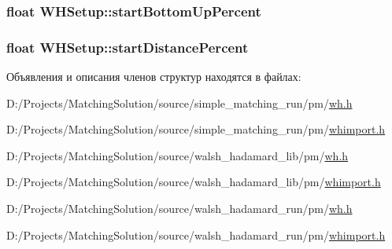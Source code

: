 \hypertarget{struct_w_h_setup_862a743cf81ffe212002e65275690fd5}{
\subsubsection[{startBottomUpPercent}]{\setlength{\rightskip}{0pt plus 5cm}float {\bf WHSetup::startBottomUpPercent}}}
\label{struct_w_h_setup_862a743cf81ffe212002e65275690fd5}


\hypertarget{struct_w_h_setup_10aec4c3c91906bb2cb318efcabf4b1a}{
\subsubsection[{startDistancePercent}]{\setlength{\rightskip}{0pt plus 5cm}float {\bf WHSetup::startDistancePercent}}}
\label{struct_w_h_setup_10aec4c3c91906bb2cb318efcabf4b1a}




Объявления и описания членов структур находятся в файлах:\begin{CompactItemize}
\item 
D:/Projects/MatchingSolution/source/simple\_\-matching\_\-run/pm/\hyperlink{simple__matching__run_2pm_2wh_8h}{wh.h}\item 
D:/Projects/MatchingSolution/source/simple\_\-matching\_\-run/pm/\hyperlink{simple__matching__run_2pm_2whimport_8h}{whimport.h}\item 
D:/Projects/MatchingSolution/source/walsh\_\-hadamard\_\-lib/pm/\hyperlink{walsh__hadamard__lib_2pm_2wh_8h}{wh.h}\item 
D:/Projects/MatchingSolution/source/walsh\_\-hadamard\_\-lib/pm/\hyperlink{walsh__hadamard__lib_2pm_2whimport_8h}{whimport.h}\item 
D:/Projects/MatchingSolution/source/walsh\_\-hadamard\_\-run/pm/\hyperlink{walsh__hadamard__run_2pm_2wh_8h}{wh.h}\item 
D:/Projects/MatchingSolution/source/walsh\_\-hadamard\_\-run/pm/\hyperlink{walsh__hadamard__run_2pm_2whimport_8h}{whimport.h}\end{CompactItemize}
